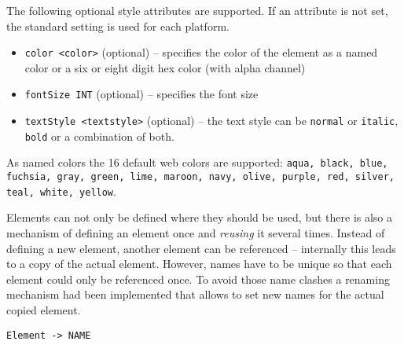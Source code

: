 The following optional style attributes are supported. If an attribute is not set, the standard setting is used for each platform.
\begin{itemize}
\item \lstinline!color <color>! (optional) -- specifies the color of the element as a named color or a six or eight digit hex color (with alpha channel)
\item \lstinline!fontSize INT! (optional) -- specifies the font size
\item \lstinline!textStyle <textstyle>! (optional) -- the text style can be \lstinline!normal! or \lstinline!italic!, \lstinline!bold! or a combination of both.
\end{itemize}

As named colors the 16 default web colors are supported: \lstinline!aqua, black, blue, fuchsia, gray, green, lime, maroon, navy, olive, purple, red, silver, teal, white, yellow!.

Elements can not only be defined where they should be used, but there is also a mechanism of defining an element once and \textit{reusing} it several times. Instead of defining a new element, another element can be referenced -- internally this leads to a copy of the actual element. However, names have to be unique so that each element could only be referenced once. To avoid those name clashes a renaming mechanism had been implemented that allows to set new names for the actual copied element.
\begin{lstlisting}
Element -> NAME
\end{lstlisting}

